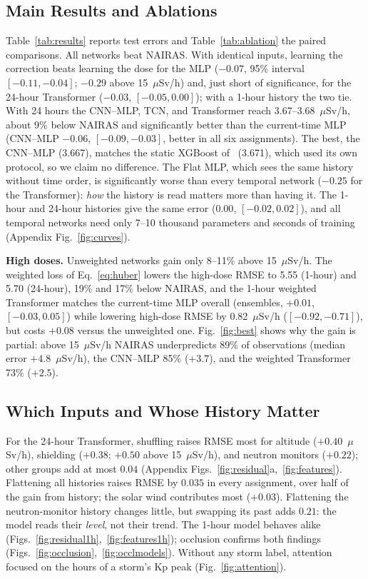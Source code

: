 \documentclass[10pt,twocolumn,letterpaper]{article}
\begin{document}
\subsection{Main Results and Ablations}
Table~\ref{tab:results} reports test errors and Table~\ref{tab:ablation} the
paired comparisons. All networks beat NAIRAS. With identical inputs, learning
the correction beats learning the dose for the MLP ($-0.07$, 95\% interval
$[-0.11,-0.04]$; $-0.29$ above 15~$\mu$Sv/h) and, just short of
significance, for the 24-hour Transformer ($-0.03$, $[-0.05,0.00]$); with a
1-hour history the two tie. With 24 hours the CNN--MLP,
TCN, and Transformer reach 3.67--3.68~$\mu$Sv/h, about 9\% below NAIRAS and
significantly better than the current-time MLP (CNN--MLP $-0.06$,
$[-0.09,-0.03]$, better in all six assignments). The best, the CNN--MLP
(3.667), matches the static XGBoost of~\cite{kc2025} (3.671), which used its
own protocol, so we claim no difference. The Flat MLP, which sees the same
history without time order, is significantly worse than every temporal
network ($-0.25$ for the Transformer): \emph{how} the history is read matters
more than having it. The 1-hour and 24-hour histories give the same error
($0.00$, $[-0.02,0.02]$), and all temporal networks need only 7--10
thousand parameters and seconds of training (Appendix Fig.~\ref{fig:curves}).



\textbf{High doses.} Unweighted networks gain only 8--11\% above
15~$\mu$Sv/h. The weighted loss of Eq.~\eqref{eq:huber} lowers the high-dose
RMSE to 5.55 (1-hour) and 5.70 (24-hour), 19\% and 17\% below NAIRAS, and the
1-hour weighted Transformer matches the current-time MLP overall (ensembles,
$+0.01$, $[-0.03,0.05]$) while lowering high-dose RMSE by
0.82~$\mu$Sv/h ($[-0.92,-0.71]$), but costs $+0.08$ versus the unweighted one. Fig.~\ref{fig:best} shows why the gain is partial: above
15~$\mu$Sv/h NAIRAS underpredicts 89\% of observations (median error
$+4.8$~$\mu$Sv/h), the CNN--MLP 85\% ($+3.7$), and the weighted Transformer
73\% ($+2.5$).

\subsection{Which Inputs and Whose History Matter}
\label{sec:attention}
For the 24-hour Transformer, shuffling raises RMSE most for altitude
($+0.40$~$\mu$Sv/h), shielding ($+0.38$; $+0.50$ above 15~$\mu$Sv/h), and
neutron monitors ($+0.22$); other groups add at most $0.04$ (Appendix
Figs.~\ref{fig:residual}a,~\ref{fig:features}). Flattening all histories
raises RMSE by $0.035$ in every assignment, over half of the gain from
history; the solar wind contributes most ($+0.03$). Flattening the
neutron-monitor history changes little, but swapping its past adds $0.21$:
the model reads their \emph{level}, not their trend. The 1-hour model behaves
alike (Figs.~\ref{fig:residual1h},~\ref{fig:features1h}); occlusion confirms both findings (Figs.~\ref{fig:occlusion},~\ref{fig:occlmodels}). Without any storm
label, attention focused on the hours of a storm's Kp peak
(Fig.~\ref{fig:attention}).
\end{document}
